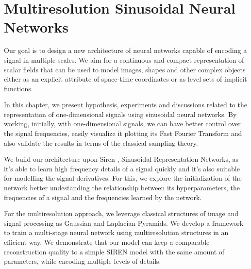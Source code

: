 

\chapter{Multiresolution Sinusoidal Neural Networks}

Our goal is to design a new architecture of neural networks capable of encoding a signal in multiple scales. We aim for a continuous and compact representation of scalar fields that can be used to model images, shapes and other complex objects either as an explicit attribute of space-time coordinates or as level sets of implicit functions.

In this chapter, we present hypothesis, experiments and discussions related to the representation of one-dimensional signals using sinusoidal neural networks. By working, initially, with one-dimensional signals, we can have better control over the signal frequencies, easily visualize it plotting its Fast Fourier Transform and also validate the results in terms of the classical sampling theory. 

We build our architecture upon Siren \cite{sitzmann2019siren}, Sinusoidal Representation Networks, as it's able to learn high frequency details of a signal quickly and it's also suitable for modelling the signal derivatives. For this, we explore the initialization of the network better undestanding the relationship between its hyperparameters, the frequencies of a signal and the frequencies learned by the network.

For the multiresolution approach, we leverage classical structures of image and signal processing as Gaussian and Laplacian Pyramids. We develop a framework to train a multi-stage neural network using multiresolution structures in an efficient way. We demonstrate that our model can keep a comparable reconstruction quality to a simple SIREN model with the same amount of parameters, while encoding multiple levels of details.

